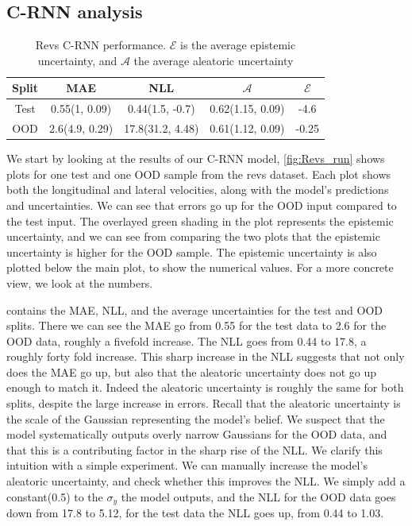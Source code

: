 \subsection{C-RNN analysis}
\label{sec:crnn_analysis}

\begin{table}[htbp]
\centering
    \begin{tabular}{c  c  c   c  c }  
        \toprule
        Split & MAE & NLL & $\mathcal{A}$ & $\mathcal{E}$\\
        \midrule
        Test & 0.55(1, 0.09) & 0.44(1.5, -0.7) & 0.62(1.15, 0.09) &  -4.6\\
        OOD  &  2.6(4.9, 0.29) &  17.8(31.2, 4.48) & 0.61(1.12, 0.09)&  -0.25\\
        \midrule
    \end{tabular}
    \caption[Revs C-RNN performance]{Revs C-RNN performance. $\mathcal{E}$ is the average epistemic uncertainty, and $\mathcal{A}$ the average aleatoric uncertainty}
    \label{tbl:revs}
\end{table}

We start by looking at the results of our C-RNN model, \cref{fig:Revs_run} shows plots for one test and one OOD sample from the revs dataset. Each plot shows both the longitudinal and lateral velocities, along with the model's predictions and uncertainties.
We can see that errors go up for the OOD input compared to the test input. The overlayed green shading in the plot represents the epistemic uncertainty, and we can see from comparing the two plots that the epistemic uncertainty is higher for the OOD sample. The epistemic uncertainty is also plotted below the main plot, to show the numerical values. For a more concrete view, we look at the numbers.

 contains the MAE, NLL, and the average uncertainties for the test and OOD splits. There we can see the MAE go from 0.55 for the test data to 2.6 for the OOD data, roughly a fivefold increase. The NLL goes from 0.44 to 17.8, a roughly forty fold increase. This sharp increase in the NLL suggests that not only does the MAE go up, but also that the aleatoric uncertainty does not go up enough to match it. Indeed the aleatoric uncertainty is roughly the same for both splits, despite the large increase in errors. 
Recall that the aleatoric uncertainty is the scale of the Gaussian representing the model's belief. We suspect that the model systematically outputs overly narrow Gaussians for the OOD data, and that this is a contributing factor in the sharp rise of the NLL.  
We clarify this intuition with a simple experiment. We can manually increase the model's aleatoric uncertainty, and check whether this improves the NLL. We simply add a constant(0.5) to the $\sigma_y$ the model outputs, and the NLL for the OOD data goes down from 17.8 to 5.12, for the test data the NLL goes up, from 0.44 to 1.03.

